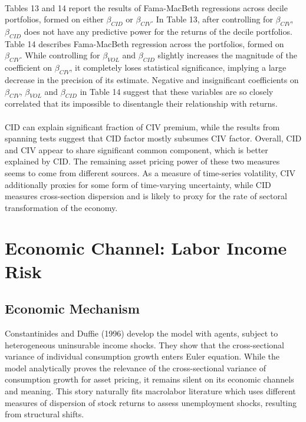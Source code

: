 \documentclass[12pt]{article}
\begin{document}
\paragraph{}
Tables 13 and 14 report the results of Fama-MacBeth regressions across decile portfolios, formed on either $\beta_{CID}$ or $\beta_{CIV}$. In Table 13, after controlling for $\beta_{CIV}$, $\beta_{CID}$ does not have any predictive power for the returns of the decile portfolios. Table 14 describes Fama-MacBeth regression across the portfolios, formed on $\beta_{CIV}$. While controlling for $\beta_{VOL}$ and $\beta_{CID}$ slightly increases the magnitude of the coefficient on $\beta_{CIV}$, it completely loses statistical significance, implying a large decrease in the precision of its estimate. Negative and insignificant coefficients on $\beta_{CIV}$, $\beta_{VOL}$ and $\beta_{CID}$ in Table 14 suggest that these variables are so closely correlated that its impossible to disentangle their relationship with returns.
\paragraph{}
CID can explain significant fraction of CIV premium, while the results from spanning tests suggest that CID factor mostly subsumes CIV factor. Overall, CID and CIV appear to share significant common component, which is better explained by CID. The remaining asset pricing power of these two measures seems to come from different sources. As a measure of time-series volatility, CIV additionally proxies for some form of time-varying uncertainty, while CID measures cross-section dispersion and is likely to proxy for the rate of sectoral transformation of the economy.

\section{Economic Channel: Labor Income Risk} \label{sec:Model}

\subsection{Economic Mechanism}

Constantinides and Duffie (1996) develop the model with agents, subject to heterogeneous uninsurable income shocks. They show that the cross-sectional variance of individual consumption growth enters Euler equation. While the model analytically proves the relevance of the cross-sectional variance of consumption growth for asset pricing, it remains silent on its economic channels and meaning. This story naturally fits macrolabor literature which uses different measures of dispersion of stock returns to assess unemployment shocks, resulting from structural shifts.
\end{document}
